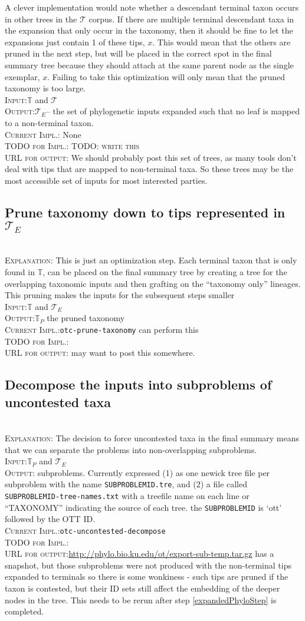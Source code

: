 \documentclass[11pt]{article}
\newcommand{\otcprune}[0]{\texttt{otc-prune-taxonomy}\xspace}
\newcommand{\otcdecompose}[0]{\texttt{otc-uncontested-decompose}\xspace}
\newcommand{\stepExplanation}[0]{\\\noindent\textsc{Explanation}:\xspace}
\newcommand{\stepInput}[0]{\\\noindent\textsc{Input}:\xspace}
\newcommand{\stepOutput}[0]{\\\noindent\textsc{Output}:\xspace}
\newcommand{\currImpl}[0]{\\\noindent\textsc{Current Impl.}:\xspace}
\newcommand{\implTODO}[0]{\\\noindent\textsc{TODO for Impl.}:\xspace}
\newcommand{\currURL}[0]{\\\noindent\textsc{URL for output}:\xspace}
\newcommand{\comment}[1]{{\color{red} \textsc{#1}}\xspace}
\newcommand{\TODO}[1]{\comment{TODO: #1}}
\newcommand{\taxonomy}[0]{\ensuremath{\mathbb{T}}\xspace}
\newcommand{\prunedTaxonomy}[0]{\ensuremath{\mathbb{T}_P}\xspace}
\newcommand{\phyloInputs}[0]{\ensuremath{\mathcal{T}}}
\newcommand{\expandedPhylo}[0]{\ensuremath{\mathcal{T}_{E}}\xspace}
\begin{document}
    A clever implementation would note whether a descendant terminal taxon occurs in other
        trees in the $\phyloInputs$ corpus. 
    If there are multiple terminal descendant taxa in the expansion that only occur in the 
        taxonomy, then it should be fine to let the expansions just contain 1 of these tips, $x$.
    This would mean that the others are pruned in the next step, but will be placed in the 
    correct spot in the final summary tree because they should attach at the same parent node
    as the single exemplar, $x$. Failing to take this optimization will only mean that the 
    pruned taxonomy is too large.
\stepInput \taxonomy and \phyloInputs
\stepOutput \expandedPhylo -- the set of phylogenetic inputs expanded such that no leaf is mapped 
    to a non-terminal taxon.
    \currImpl None
    \implTODO \TODO{write this}
\currURL We should probably post this set of trees, as many tools don't deal with tips that 
are mapped to non-terminal taxa. So these trees may be the most accessible set of inputs
for most interested parties.
 
\subsection{Prune taxonomy down to tips represented in \expandedPhylo}\label{prunedTaxonomyStep}
\stepExplanation This is just an optimization step.
Each terminal taxon that is only found in \taxonomy, can be placed on the 
    final summary tree by creating a tree for the overlapping taxonomic
    inputs and then grafting on the ``taxonomy only'' lineages.
This pruning makes the inputs for the subsequent steps smaller
\stepInput \taxonomy and \expandedPhylo
\stepOutput \prunedTaxonomy the pruned taxonomy
\currImpl \otcprune can perform this
\implTODO
\currURL may want to post this somewhere. 

\subsection{Decompose the inputs into subproblems of uncontested taxa}\label{decomposeStep}
\stepExplanation The decision to force uncontested taxa in the final
    summary means that we can separate the problems into non-overlapping
    subproblems.
\stepInput \prunedTaxonomy and \expandedPhylo
\stepOutput subproblems. Currently expressed (1) as one newick tree file  per subproblem
    with the name \texttt{SUBPROBLEMID.tre}, and
    (2) a file called \texttt{SUBPROBLEMID-tree-names.txt} with a treefile name 
    on each line or ``TAXONOMY'' indicating the source of each tree. 
    the \texttt{SUBPROBLEMID} is `ott' followed by the OTT ID.
\currImpl \otcdecompose
\implTODO 
\currURL \url{http://phylo.bio.ku.edu/ot/export-sub-temp.tar.gz} has a snapshot, but
those subproblems were not produced with the non-terminal tips expanded to terminals
so there is some wonkiness - such tips are pruned if the taxon is contested, but their
ID sets still affect the embedding of the deeper nodes in the tree. This needs 
to be rerun after step \ref{expandedPhyloStep} is completed.
 
\end{document}
